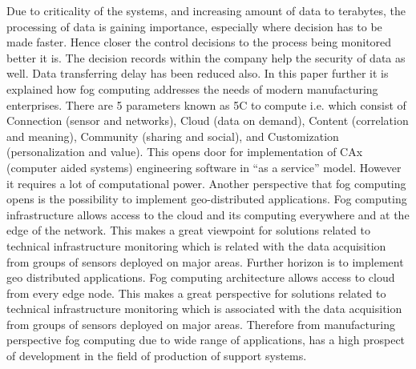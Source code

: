 Due to criticality of the systems, and increasing amount of data to terabytes, the processing of data is gaining importance, especially where decision has to be made faster. Hence closer the control decisions to the process being monitored better it is. The decision records within the company help the security of data as well. Data transferring delay has been reduced also. In this paper further it is explained how fog computing addresses the needs of modern manufacturing enterprises. There are 5 parameters known as 5C to compute i.e. which consist of Connection (sensor and networks), Cloud (data on demand), Content (correlation and meaning), Community (sharing and social), and Customization (personalization and value). This opens door for implementation of CAx (computer aided systems) engineering software in “as a service” model. However it requires a lot of computational power. Another perspective that fog computing opens is the possibility to implement geo-distributed applications. Fog computing infrastructure allows access to the cloud and its computing everywhere and at the edge of the network. This makes a great viewpoint for solutions related to technical infrastructure monitoring which is related with the data acquisition from groups of sensors deployed on major areas. Further horizon is to implement geo distributed applications. Fog computing architecture allows access to cloud from every edge node. This makes a great perspective for solutions related to technical infrastructure monitoring which is associated with the data acquisition from groups of sensors deployed on major areas. Therefore from manufacturing perspective fog computing due to wide range of applications, has a high prospect of development in the field of production of support systems.
